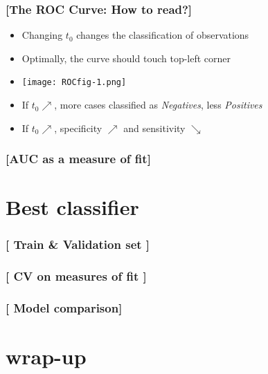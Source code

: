 \documentclass[xcolor=x11names,compress]{beamer}
\renewcommand{\(}{\begin{columns}}
\renewcommand{\)}{\end{columns}}
\newcommand{\<}[1]{\begin{column}{#1}}
\renewcommand{\>}{\end{column}}
\begin{document}
\begin{frame} %
\frametitle{\textcolor{brique}{[The ROC Curve: How to read?]}}
\pause
 \begin{itemize}[<+->]
  \item[] Changing $t_0$ changes the classification of observations
  \item  Optimally, the curve should touch top-left corner
  \item[] \begin{center}\texttt{[image: ROCfig-1.png]} \end{center}
  \item If $t_0  \nearrow $,  more cases  classified as \textit{Negatives}, less \textit{Positives}
  \item If $t_0  \nearrow $,   specificity  $\nearrow $ and sensitivity $\searrow$
\end{itemize}
\end{frame}

\begin{frame} %
\frametitle{\textcolor{brique}{[AUC as a measure of fit]}}
\end{frame}

\section{Best classifier}

\begin{frame} %
\frametitle{\textcolor{brique}{[ Train \& Validation set ]}}
\end{frame}

\begin{frame} %
\frametitle{\textcolor{brique}{[ CV on measures of fit ]}}
\end{frame}

\begin{frame} %
\frametitle{\textcolor{brique}{[ Model comparison]}}
\end{frame}

\section{wrap-up}
\end{document}
